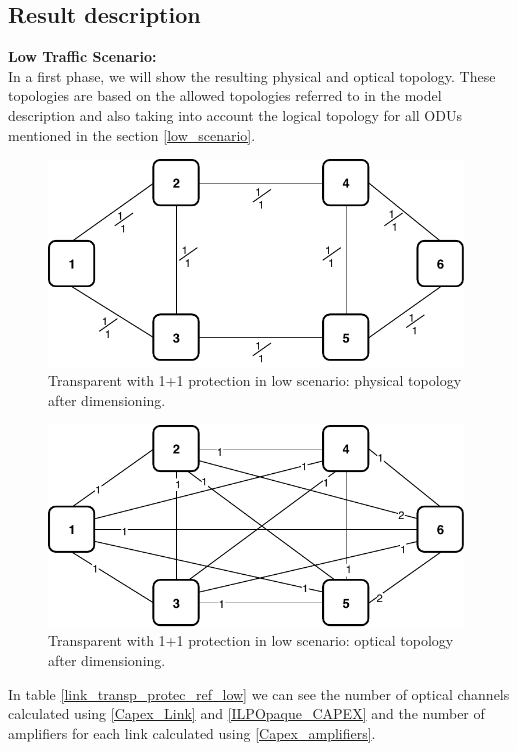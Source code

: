 \subsection{Result description}

\textbf{Low Traffic Scenario:}\\

In a first phase, we will show the resulting physical and optical topology. These topologies are based on the allowed topologies referred to in the model description and also taking into account the logical topology for all ODUs mentioned in the section \ref{low_scenario}.\\
\newpage
\begin{figure}[h!]
\centering
\includegraphics[width=11cm]{sdf/ilp/transparent_protection/figures/physical_topology}
\caption{Transparent with 1+1 protection in low scenario: physical topology after dimensioning.}
\label{physical2_protectionlow}
\end{figure}

\begin{figure}[h!]
\centering
\includegraphics[width=11cm]{sdf/ilp/transparent_protection/figures/optical_topology_low}
\caption{Transparent with 1+1 protection in low scenario: optical topology after dimensioning.}
\label{optical2_protectionlow}
\end{figure}

In table \ref{link_transp_protec_ref_low} we can see the number of optical channels calculated using \ref{Capex_Link} and \ref{ILPOpaque_CAPEX} and the number of amplifiers for each link calculated using \ref{Capex_amplifiers}.\\

